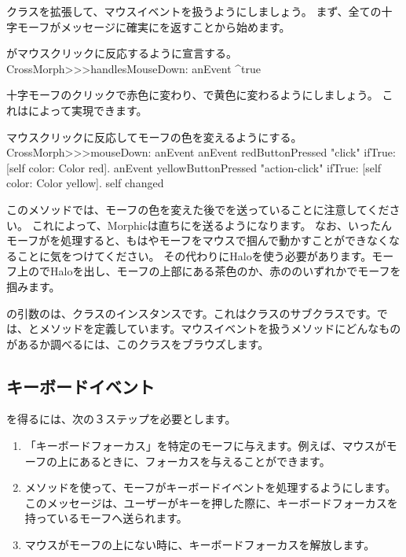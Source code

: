 \documentclass[a4paper,10pt,twoside]{book}
\begin{document}
クラスを拡張して、マウスイベントを扱うようにしましょう。
まず、全ての十字モーフがメッセージに確実にを返すことから始めます。

\begin{method}{がマウスクリックに反応するように宣言する。}
CrossMorph>>>handlesMouseDown: anEvent
	^true
\end{method}

十字モーフのクリックで赤色に変わり、\actclick で黄色に変わるようにしましょう。
これはによって実現できます。

\begin{method}[mouseDown]{マウスクリックに反応してモーフの色を変えるようにする。}
CrossMorph>>>mouseDown: anEvent
	anEvent redButtonPressed "click"
		ifTrue: [self color: Color red].
	anEvent yellowButtonPressed "action-click"
		ifTrue: [self color: Color yellow].
	self changed
\end{method}

このメソッドでは、モーフの色を変えた後でを送っていることに注意してください。
これによって、Morphicは直ちにを送るようになります。
なお、いったんモーフがを処理すると、もはやモーフをマウスで掴んで動かすことができなくなることに気をつけてください。
その代わりにHaloを使う必要があります。モーフ上の\metaclick でHaloを出し、モーフの上部にある茶色の\moveHandle{}か、赤の\grabHandle{}のいずれかでモーフを掴みます。

の引数のは、\mbox{クラス}のインスタンスです。これはクラスのサブクラスです。では、とメソッドを定義しています。マウスイベントを扱うメソッドにどんなものがあるか調べるには、このクラスをブラウズします。

\subsection{キーボードイベント}

を得るには、次の３ステップを必要とします。
\begin{enumerate}
	\item 「キーボードフォーカス」を特定のモーフに与えます。例えば、マウスがモーフの上にあるときに、フォーカスを与えることができます。
	\item {}メソッドを使って、モーフがキーボードイベントを処理するようにします。このメッセージは、ユーザーがキーを押した際に、キーボードフォーカスを持っているモーフへ送られます。
	\item マウスがモーフの上にない時に、キーボードフォーカスを解放します。
\end{enumerate}
\end{document}
